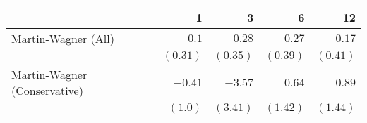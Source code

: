 \begin{tabular}{lrrrr}
\toprule
                                     &         1 &         3 &         6 &        12 \\
\midrule
Martin-Wagner (All)  & $-0.1$ & $-0.28$ & $-0.27$ & $-0.17$ \\
 & $(0.31)$ & $(0.35)$ & $(0.39)$ & $(0.41)$ \\
Martin-Wagner (Conservative)  & $-0.41$ & $-3.57$ & $0.64$ & $0.89$ \\
 & $(1.0)$ & $(3.41)$ & $(1.42)$ & $(1.44)$ \\
\bottomrule
\end{tabular}
\\
